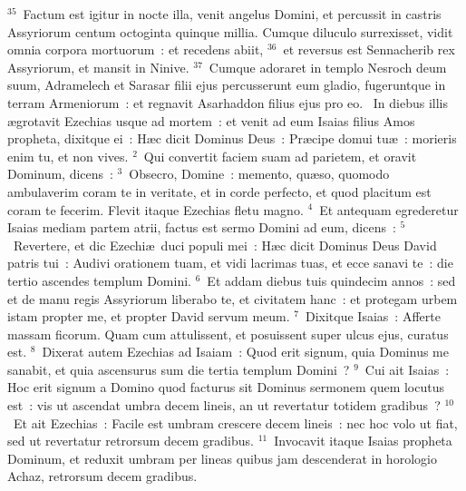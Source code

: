 ${}^{35}$~Factum est igitur in nocte illa, venit angelus Domini, et percussit in castris Assyriorum centum octoginta quinque millia. Cumque diluculo surrexisset, vidit omnia corpora mortuorum~: et recedens abiit,
${}^{36}$~et reversus est Sennacherib rex Assyriorum, et mansit in Ninive.
${}^{37}$~Cumque adoraret in templo Nesroch deum suum, Adramelech et Sarasar filii ejus percusserunt eum gladio, fugeruntque in terram Armeniorum~: et regnavit Asarhaddon filius ejus pro eo.
~In diebus illis \ae grotavit Ezechias usque ad mortem~: et venit ad eum Isaias filius Amos propheta, dixitque ei~: H\ae c dicit Dominus Deus~: Pr\ae cipe domui tu\ae~: morieris enim tu, et non vives.
${}^{2}$~Qui convertit faciem suam ad parietem, et oravit Dominum, dicens~:
${}^{3}$~Obsecro, Domine~: memento, qu\ae so, quomodo ambulaverim coram te in veritate, et in corde perfecto, et quod placitum est coram te fecerim. Flevit itaque Ezechias fletu magno.
${}^{4}$~Et antequam egrederetur Isaias mediam partem atrii, factus est sermo Domini ad eum, dicens~:
${}^{5}$~Revertere, et dic Ezechi\ae\ duci populi mei~: H\ae c dicit Dominus Deus David patris tui~: Audivi orationem tuam, et vidi lacrimas tuas, et ecce sanavi te~: die tertio ascendes templum Domini.
${}^{6}$~Et addam diebus tuis quindecim annos~: sed et de manu regis Assyriorum liberabo te, et civitatem hanc~: et protegam urbem istam propter me, et propter David servum meum.
${}^{7}$~Dixitque Isaias~: Afferte massam ficorum. Quam cum attulissent, et posuissent super ulcus ejus, curatus est.
${}^{8}$~Dixerat autem Ezechias ad Isaiam~: Quod erit signum, quia Dominus me sanabit, et quia ascensurus sum die tertia templum Domini~?
${}^{9}$~Cui ait Isaias~: Hoc erit signum a Domino quod facturus sit Dominus sermonem quem locutus est~: vis ut ascendat umbra decem lineis, an ut revertatur totidem gradibus~?
${}^{10}$~Et ait Ezechias~: Facile est umbram crescere decem lineis~: nec hoc volo ut fiat, sed ut revertatur retrorsum decem gradibus.
${}^{11}$~Invocavit itaque Isaias propheta Dominum, et reduxit umbram per lineas quibus jam descenderat in horologio Achaz, retrorsum decem gradibus.


